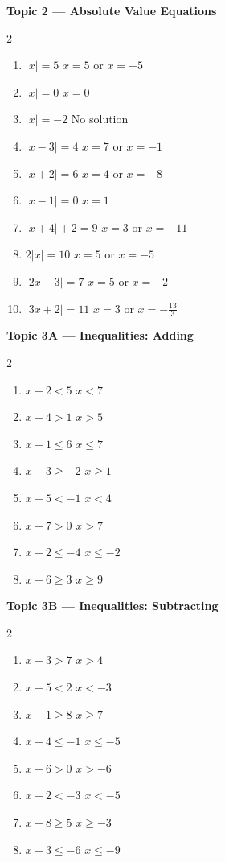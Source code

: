 \documentclass[12pt]{article}
\begin{document}
\vspace{8pt}
\noindent\textbf{Topic 2 --- Absolute Value Equations}
\begin{multicols}{2}
\begin{enumerate}[label=\textbf{\arabic*.}, itemsep=3pt]
  \item $|x|=5$ \hfill $x=5$ or $x=-5$
  \item $|x|=0$ \hfill $x=0$
  \item $|x|=-2$ \hfill No solution
  \item $|x-3|=4$ \hfill $x=7$ or $x=-1$
  \item $|x+2|=6$ \hfill $x=4$ or $x=-8$
  \item $|x-1|=0$ \hfill $x=1$
  \item $|x+4|+2=9$ \hfill $x=3$ or $x=-11$
  \item $2|x|=10$ \hfill $x=5$ or $x=-5$
  \item $|2x-3|=7$ \hfill $x=5$ or $x=-2$
  \item $|3x+2|=11$ \hfill $x=3$ or $x=-\frac{13}{3}$
\end{enumerate}
\end{multicols}

\vspace{8pt}
\noindent\textbf{Topic 3A --- Inequalities: Adding}
\begin{multicols}{2}
\begin{enumerate}[label=\textbf{\arabic*.}, itemsep=3pt]
  \item $x - 2 < 5$ \hfill $x < 7$
  \item $x - 4 > 1$ \hfill $x > 5$
  \item $x - 1 \leq 6$ \hfill $x \leq 7$
  \item $x - 3 \geq -2$ \hfill $x \geq 1$
  \item $x - 5 < -1$ \hfill $x < 4$
  \item $x - 7 > 0$ \hfill $x > 7$
  \item $x - 2 \leq -4$ \hfill $x \leq -2$
  \item $x - 6 \geq 3$ \hfill $x \geq 9$
\end{enumerate}
\end{multicols}

\vspace{8pt}
\noindent\textbf{Topic 3B --- Inequalities: Subtracting}
\begin{multicols}{2}
\begin{enumerate}[label=\textbf{\arabic*.}, itemsep=3pt]
  \item $x + 3 > 7$ \hfill $x > 4$
  \item $x + 5 < 2$ \hfill $x < -3$
  \item $x + 1 \geq 8$ \hfill $x \geq 7$
  \item $x + 4 \leq -1$ \hfill $x \leq -5$
  \item $x + 6 > 0$ \hfill $x > -6$
  \item $x + 2 < -3$ \hfill $x < -5$
  \item $x + 8 \geq 5$ \hfill $x \geq -3$
  \item $x + 3 \leq -6$ \hfill $x \leq -9$
\end{enumerate}
\end{multicols}
\end{document}
